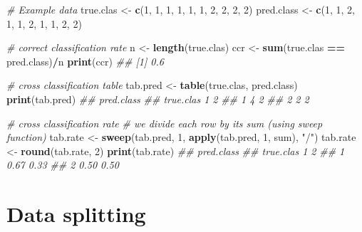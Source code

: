 \documentclass[
]{book}
\newenvironment{Shaded}{\begin{snugshade}}{\end{snugshade}}
\newcommand{\CommentTok}[1]{\textcolor[rgb]{0.56,0.35,0.01}{\textit{#1}}}
\newcommand{\DecValTok}[1]{\textcolor[rgb]{0.00,0.00,0.81}{#1}}
\newcommand{\KeywordTok}[1]{\textcolor[rgb]{0.13,0.29,0.53}{\textbf{#1}}}
\newcommand{\NormalTok}[1]{#1}
\newcommand{\OperatorTok}[1]{\textcolor[rgb]{0.81,0.36,0.00}{\textbf{#1}}}
\newcommand{\StringTok}[1]{\textcolor[rgb]{0.31,0.60,0.02}{#1}}
\theoremstyle{definition}
\theoremstyle{definition}
\theoremstyle{definition}
\theoremstyle{remark}
\begin{document}
\begin{Shaded}
\begin{Highlighting}[]
\CommentTok{\# Example data}
\NormalTok{true.clas \textless{}{-}}\StringTok{ }\KeywordTok{c}\NormalTok{(}\DecValTok{1}\NormalTok{, }\DecValTok{1}\NormalTok{, }\DecValTok{1}\NormalTok{, }\DecValTok{1}\NormalTok{, }\DecValTok{1}\NormalTok{, }\DecValTok{1}\NormalTok{, }\DecValTok{2}\NormalTok{, }\DecValTok{2}\NormalTok{, }\DecValTok{2}\NormalTok{, }\DecValTok{2}\NormalTok{)}
\NormalTok{pred.class \textless{}{-}}\StringTok{  }\KeywordTok{c}\NormalTok{(}\DecValTok{1}\NormalTok{, }\DecValTok{1}\NormalTok{, }\DecValTok{2}\NormalTok{, }\DecValTok{1}\NormalTok{, }\DecValTok{1}\NormalTok{, }\DecValTok{2}\NormalTok{, }\DecValTok{1}\NormalTok{, }\DecValTok{1}\NormalTok{, }\DecValTok{2}\NormalTok{, }\DecValTok{2}\NormalTok{)}

\CommentTok{\# correct classification rate}
\NormalTok{n \textless{}{-}}\StringTok{ }\KeywordTok{length}\NormalTok{(true.clas)}
\NormalTok{ccr \textless{}{-}}\StringTok{ }\KeywordTok{sum}\NormalTok{(true.clas }\OperatorTok{==}\StringTok{ }\NormalTok{pred.class)}\OperatorTok{/}\NormalTok{n}
\KeywordTok{print}\NormalTok{(ccr)}
\CommentTok{\#\# [1] 0.6}

\CommentTok{\# cross classification table}
\NormalTok{tab.pred \textless{}{-}}\StringTok{ }\KeywordTok{table}\NormalTok{(true.clas, pred.class)}
\KeywordTok{print}\NormalTok{(tab.pred)}
\CommentTok{\#\#          pred.class}
\CommentTok{\#\# true.clas 1 2}
\CommentTok{\#\#         1 4 2}
\CommentTok{\#\#         2 2 2}

\CommentTok{\# cross classification rate}
\CommentTok{\# we divide each row by its sum (using sweep function)}
\NormalTok{tab.rate \textless{}{-}}\StringTok{ }\KeywordTok{sweep}\NormalTok{(tab.pred, }\DecValTok{1}\NormalTok{, }\KeywordTok{apply}\NormalTok{(tab.pred, }\DecValTok{1}\NormalTok{, sum), }\StringTok{"/"}\NormalTok{)}
\NormalTok{tab.rate \textless{}{-}}\StringTok{ }\KeywordTok{round}\NormalTok{(tab.rate, }\DecValTok{2}\NormalTok{)}
\KeywordTok{print}\NormalTok{(tab.rate)}
\CommentTok{\#\#          pred.class}
\CommentTok{\#\# true.clas    1    2}
\CommentTok{\#\#         1 0.67 0.33}
\CommentTok{\#\#         2 0.50 0.50}
\end{Highlighting}
\end{Shaded}

\hypertarget{data-splitting}{%
\section{Data splitting}\label{data-splitting}}
\end{document}

